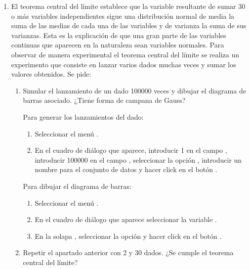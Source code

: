 \begin{enumerate}[leftmargin=*]
\item El teorema central del límite establece que la variable resultante de sumar 30 o más variables independientes
sigue una distribución normal de media la suma de las medias de cada una de las variables y de varianza la suma de sus
varianzas.
Esta es la explicación de que una gran parte de las variables continuas que aparecen en la naturaleza sean variables
normales.
Para observar de manera experimental el teorema central del límite se realiza un experimento que consiste en lanzar
varios dados muchas veces y sumar los valores obtenidos. 
Se pide:
\begin{enumerate}
\item Simular el lanzamiento de un dado 100000 veces y dibujar el diagrama de barras asociado. 
¿Tiene forma de campana de Gauss?
\begin{indicacion}{Para generar los lanzamientos del dado: 
\begin{enumerate}
\item Seleccionar el menú .
\item En el cuadro de diálogo que aparece, introducir 1 en el campo , introducir 100000 en el
campo , seleccionar la opción , introducir un nombre para el conjunto
de datos y hacer click en el botón .
\end{enumerate}
Para dibujar el diagrama de barras:
\begin{enumerate}
\item Seleccionar el menú .
\item En el cuadro de diálogo que aparece seleccionar la variable .
\item En la solapa , seleccionar la opción  y hacer click en
el botón .
\end{enumerate}}
\end{indicacion}

\item Repetir el apartado anterior con 2 y 30 dados. 
¿Se cumple el teorema central del límite?
\end{enumerate}



\end{enumerate}
